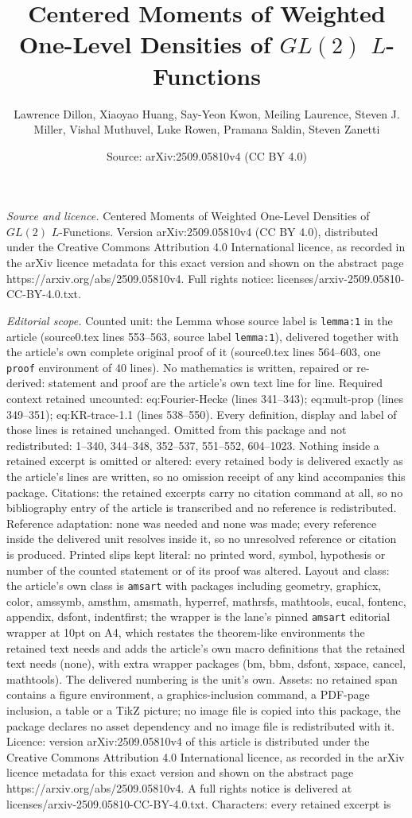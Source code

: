 \documentclass[10pt,a4paper]{amsart}
\title[Centered Moments of Weighted One-Level Densities of $GL(2)$ ]{Centered Moments of Weighted One-Level Densities of $GL(2)$ $L$-Functions}
\author{Lawrence Dillon, Xiaoyao Huang, Say-Yeon Kwon, Meiling Laurence, Steven J. Miller, Vishal Muthuvel, Luke Rowen, Pramana Saldin, Steven Zanetti}
\date{Source: arXiv:2509.05810v4 (CC BY 4.0)}
\begin{document}
\maketitle

\noindent\emph{Source and licence.} Centered Moments of Weighted One-Level Densities of $GL(2)$ $L$-Functions. Version arXiv:2509.05810v4 (CC BY 4.0), distributed under the Creative Commons Attribution 4.0 International licence, as recorded in the arXiv licence metadata for this exact version and shown on the abstract page https://arxiv.org/abs/2509.05810v4. Full rights notice: licenses/arxiv-2509.05810-CC-BY-4.0.txt.\par\smallskip

\noindent\textit{Editorial scope.} Counted unit: the Lemma whose source label is \texttt{lemma:1} in the article (source0.tex lines 553--563, source label \texttt{lemma:1}), delivered together with the article's own complete original proof of it (source0.tex lines 564--603, one \texttt{proof} environment of 40 lines). No mathematics is written, repaired or re-derived: statement and proof are the article's own text line for line. Required context retained uncounted: eq:Fourier-Hecke (lines 341--343); eq:mult-prop (lines 349--351); eq:KR-trace-1.1 (lines 538--550). Every definition, display and label of those lines is retained unchanged. Omitted from this package and not redistributed: 1--340, 344--348, 352--537, 551--552, 604--1023. Nothing inside a retained excerpt is omitted or altered: every retained body is delivered exactly as the article's lines are written, so no omission receipt of any kind accompanies this package. Citations: the retained excerpts carry no citation command at all, so no bibliography entry of the article is transcribed and no reference is redistributed. Reference adaptation: none was needed and none was made; every reference inside the delivered unit resolves inside it, so no unresolved reference or citation is produced. Printed slips kept literal: no printed word, symbol, hypothesis or number of the counted statement or of its proof was altered. Layout and class: the article's own class is \texttt{amsart} with packages including geometry, graphicx, color, amssymb, amsthm, amsmath, hyperref, mathrsfs, mathtools, eucal, fontenc, appendix, dsfont, indentfirst; the wrapper is the lane's pinned \texttt{amsart} editorial wrapper at 10pt on A4, which restates the theorem-like environments the retained text needs and adds the article's own macro definitions that the retained text needs (none), with extra wrapper packages (bm, bbm, dsfont, xspace, cancel, mathtools). The delivered numbering is the unit's own. Assets: no retained span contains a figure environment, a graphics-inclusion command, a PDF-page inclusion, a table or a TikZ picture; no image file is copied into this package, the package declares no asset dependency and no image file is redistributed with it. Licence: version arXiv:2509.05810v4 of this article is distributed under the Creative Commons Attribution 4.0 International licence, as recorded in the arXiv licence metadata for this exact version and shown on the abstract page https://arxiv.org/abs/2509.05810v4. A full rights notice is delivered at licenses/arxiv-2509.05810-CC-BY-4.0.txt. Characters: every retained excerpt is 
\end{document}
